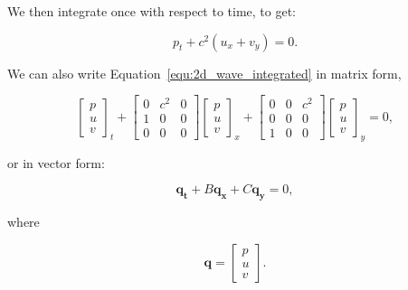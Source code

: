 We then integrate once with respect to time, to get:

\begin{equation} \label{equ:2d_wave_integrated}
    p_t + c^2\left ( u_x + v_y \right ) = 0.
\end{equation}

We can also write Equation~\ref{equ:2d_wave_integrated} in matrix form,

\begin{equation} \label{equ:2d_wave_matrix}
    \begin{bmatrix}
        p \\ 
        u \\ 
        v
    \end{bmatrix}_t +
    \begin{bmatrix}
        0 & c^2 & 0 \\ 
        1 & 0 & 0 \\ 
        0 & 0 & 0
    \end{bmatrix}
    \begin{bmatrix}
        p\\ 
        u\\ 
        v
    \end{bmatrix}_x + 
    \begin{bmatrix}
        0 & 0 & c^2 \\ 
        0 & 0 & 0 \\ 
        1 & 0 & 0
    \end{bmatrix}
    \begin{bmatrix}
        p\\ 
        u\\ 
        v
    \end{bmatrix}_y = 0,
\end{equation}

\noindent
or in vector form:

\begin{equation} \label{equ:2d_wave_vector}
    \mathbf{q_t} + B \mathbf{q_x} + C \mathbf{q_y} = 0,
\end{equation}

\noindent
where

\begin{equation} \label{equ:q}
    \mathbf{q}  = 
    \begin{bmatrix}
        p\\ 
        u\\ 
        v
    \end{bmatrix}.
\end{equation}

